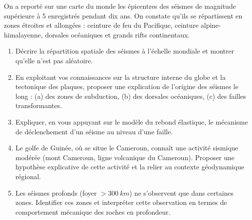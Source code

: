 \documentclass[11pt]{article}
\begin{document}
\begin{exercice}
On a reporté sur une carte du monde les épicentres des séismes de magnitude supérieure à 5 enregistrés pendant dix ans. On constate qu'ils se répartissent en zones étroites et allongées : ceinture de feu du Pacifique, ceinture alpine-himalayenne, dorsales océaniques et grands rifts continentaux.

\begin{enumerate}
\item Décrire la répartition spatiale des séismes à l'échelle mondiale et montrer qu'elle n'est pas aléatoire.
\item En exploitant vos connaissances sur la structure interne du globe et la tectonique des plaques, proposer une explication de l'origine des séismes le long : (a) des zones de subduction, (b) des dorsales océaniques, (c) des failles transformantes.
\item Expliquer, en vous appuyant sur le modèle du rebond élastique, le mécanisme de déclenchement d'un séisme au niveau d'une faille.
\item Le golfe de Guinée, où se situe le Cameroun, connaît une activité sismique modérée (mont Cameroun, ligne volcanique du Cameroun). Proposer une hypothèse explicative de cette activité et la relier au contexte géodynamique régional.
\item Les séismes profonds (foyer $> \SI{300}{km}$) ne s'observent que dans certaines zones. Identifier ces zones et interpréter cette observation en termes de comportement mécanique des roches en profondeur.
\end{enumerate}
\end{exercice}
\end{document}
